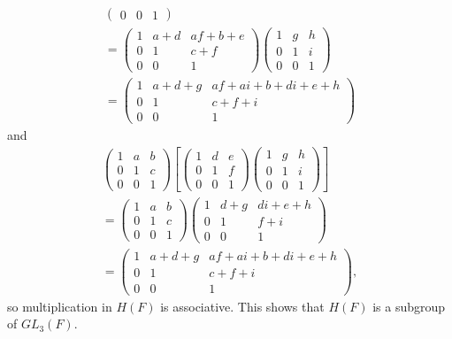 \begin{enumerate}
\begin{solution}
\begin{multline*}
\begin{pmatrix}
        0 & 0 & 1
      \end{pmatrix} \\
      =
      \begin{pmatrix}
        1 & a + d & af + b + e \\
        0 & 1 & c + f \\
        0 & 0 & 1
      \end{pmatrix}
      \begin{pmatrix}
        1 & g & h \\
        0 & 1 & i \\
        0 & 0 & 1
      \end{pmatrix} \\
      =
      \begin{pmatrix}
        1 & a + d + g & af + ai + b + di + e + h \\
        0 & 1 & c + f + i \\
        0 & 0 & 1
      \end{pmatrix}
    \end{multline*}
    and
    \begin{multline*}
      \begin{pmatrix}
        1 & a & b \\
        0 & 1 & c \\
        0 & 0 & 1
      \end{pmatrix}
      \left[
        \begin{pmatrix}
          1 & d & e \\
          0 & 1 & f \\
          0 & 0 & 1
        \end{pmatrix}
        \begin{pmatrix}
          1 & g & h \\
          0 & 1 & i \\
          0 & 0 & 1
        \end{pmatrix}
      \right] \\
      =
      \begin{pmatrix}
        1 & a & b \\
        0 & 1 & c \\
        0 & 0 & 1
      \end{pmatrix}
      \begin{pmatrix}
        1 & d + g & di + e + h \\
        0 & 1 & f + i \\
        0 & 0 & 1
      \end{pmatrix} \\
      =
      \begin{pmatrix}
        1 & a + d + g & af + ai + b + di + e + h \\
        0 & 1 & c + f + i \\
        0 & 0 & 1
      \end{pmatrix},
    \end{multline*}
    so multiplication in $H(F)$ is associative. This shows that $H(F)$
    is a subgroup of $GL_3(F)$.


\end{solution}
\end{enumerate}
